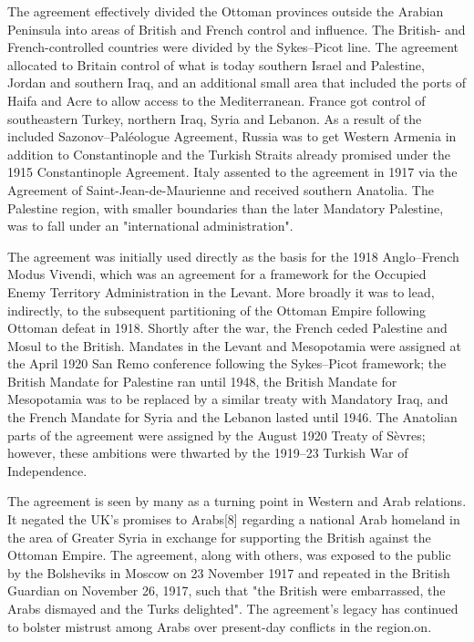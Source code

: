 \documentclass[a4paper,]{book}
\begin{document}
The agreement effectively divided the Ottoman provinces outside the Arabian Peninsula into areas of British and French control and influence. The British- and French-controlled countries were divided by the Sykes–Picot line. The agreement allocated to Britain control of what is today southern Israel and Palestine, Jordan and southern Iraq, and an additional small area that included the ports of Haifa and Acre to allow access to the Mediterranean. France got control of southeastern Turkey, northern Iraq, Syria and Lebanon. As a result of the included Sazonov–Paléologue Agreement, Russia was to get Western Armenia in addition to Constantinople and the Turkish Straits already promised under the 1915 Constantinople Agreement. Italy assented to the agreement in 1917 via the Agreement of Saint-Jean-de-Maurienne and received southern Anatolia. The Palestine region, with smaller boundaries than the later Mandatory Palestine, was to fall under an "international administration".

The agreement was initially used directly as the basis for the 1918 Anglo–French Modus Vivendi, which was an agreement for a framework for the Occupied Enemy Territory Administration in the Levant. More broadly it was to lead, indirectly, to the subsequent partitioning of the Ottoman Empire following Ottoman defeat in 1918. Shortly after the war, the French ceded Palestine and Mosul to the British. Mandates in the Levant and Mesopotamia were assigned at the April 1920 San Remo conference following the Sykes–Picot framework; the British Mandate for Palestine ran until 1948, the British Mandate for Mesopotamia was to be replaced by a similar treaty with Mandatory Iraq, and the French Mandate for Syria and the Lebanon lasted until 1946. The Anatolian parts of the agreement were assigned by the August 1920 Treaty of Sèvres; however, these ambitions were thwarted by the 1919–23 Turkish War of Independence.

The agreement is seen by many as a turning point in Western and Arab relations. It negated the UK's promises to Arabs[8] regarding a national Arab homeland in the area of Greater Syria in exchange for supporting the British against the Ottoman Empire. The agreement, along with others, was exposed to the public by the Bolsheviks in Moscow on 23 November 1917 and repeated in the British Guardian on November 26, 1917, such that "the British were embarrassed, the Arabs dismayed and the Turks delighted". The agreement's legacy has continued to bolster mistrust among Arabs over present-day conflicts in the region.on.
\end{document}
